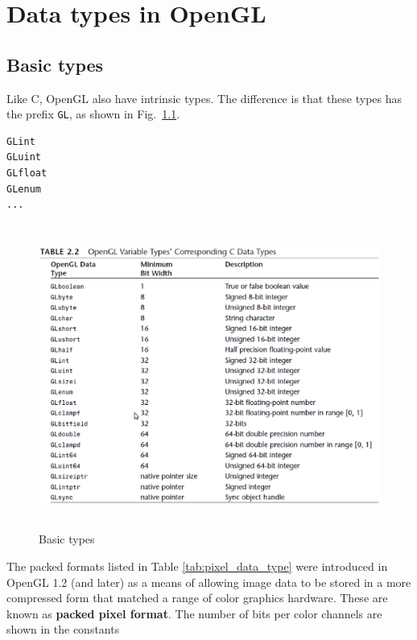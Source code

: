 \chapter{Data types in OpenGL}


\section{Basic types}
\label{sec:basic-types}

Like C, OpenGL also have intrinsic types. The difference is that these
types has the prefix \verb!GL!, as shown in Fig.~\ref{fig:types}.
\begin{verbatim}
GLint
GLuint
GLfloat 
GLenum
...
\end{verbatim}

\begin{figure}[hbt]
  \centerline{\includegraphics[height=10cm,
    angle=0]{./images/OpenGL_types.eps}}
  \caption{Basic types}
  \label{fig:types}
\end{figure}

The packed formats listed in Table \ref{tab:pixel_data_type} were
introduced in OpenGL 1.2 (and later) as a means of allowing image data
to be stored in a more compressed form that matched a range of color
graphics hardware. These are known as {\bf packed pixel format}. The
number of bits per color channels are shown in the constants


